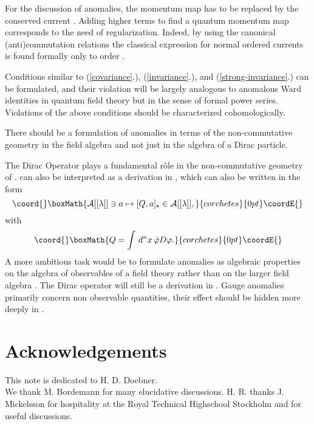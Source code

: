 \documentclass[a4paper,12pt]{article}
\begin{document}
For the discussion of anomalies, the momentum map \coordHE{} has to be
replaced by the conserved current \coordHE{}. Adding higher
terms to find a quantum momentum map corresponds to the need of
regularization. Indeed, by using the canonical (anti)commutation relations
the classical expression for normal ordered currents is
found formally only to order \myHighlight{$\hbar$}\coordHE{}.

Conditions similar to (\ref{covariance}.), (\ref{invariance}.), and
(\ref{strong-invariance}.) can be formulated, and their violation will be largely 
analogous to anomalous Ward identities in quantum field theory but in the sense 
of formal power series. Violations of the above conditions should be
characterized cohomologically.

There should be a formulation of anomalies in terms of the non-commutative
geometry in the field algebra \coordHE{} and not just in the
algebra \coordHE{} of a Dirac particle.

The Dirac Operator plays a fundamental r\^ole in the non-commutative geometry of 
\coordHE{}. \coordHE{} can also be interpreted as a derivation in
\coordHE{}, which can also be written in the form 
\[\coord{}\boxMath{
\mathcal A[[\lambda]]\ni a\mapsto[Q,a]_\star\in\mathcal A[[\lambda]],
}{corchetes}{0pt}\coordE{}\]
with
\[\coord{}\boxMath{
Q=\int\,d^nx\,\bar\varphi D\varphi.
}{corchetes}{0pt}\coordE{}\]
A more ambitious task would be to formulate anomalies as algebraic properties on 
the algebra \coordHE{} of observables of a field theory rather than
on the larger field algebra \coordHE{}. The Dirac operator will
still be a derivation in \coordHE{}. Gauge anomalies primarily
concern non observable quantities, their effect should be hidden more deeply in
\coordHE{}. 


\section*{Acknowledgements} 

This note is dedicated to H. D. Doebner.\\
We thank M. Bordemann for many elucidative discussions. H. R. thanks
J. Mickelsson for hospitality at the Royal Technical Highschool Stockholm and
for useful discussions. 
\end{document}

